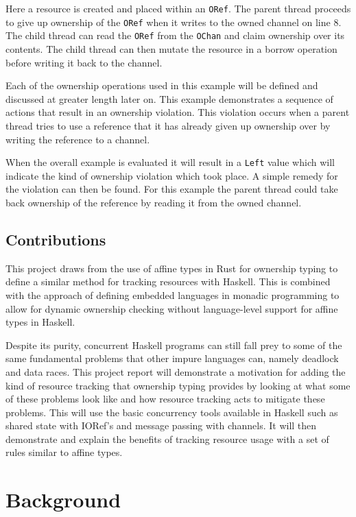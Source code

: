 \documentclass[onehalf,11pt]{beavtex}
\begin{document}
Here a resource is created and placed within an \texttt{ORef}.
The parent thread proceeds to give up ownership of the \texttt{ORef} when it
writes to the owned channel on line 8.
The child thread can read the \texttt{ORef} from the \texttt{OChan} and claim
ownership over its contents.
The child thread can then mutate the resource in a borrow operation before
writing it back to the channel. 

Each of the ownership operations used in this example will be defined
and discussed at greater length later on.
This example demonstrates a sequence of actions that result in an ownership
violation.
This violation occurs when a parent thread tries to use a reference that it
has already given up ownership over by writing the reference to a channel.

When the overall example is evaluated it will result in a \texttt{Left} value
which will indicate the kind of ownership violation which took place.
A simple remedy for the violation can then be found.
For this example the parent thread could take back ownership of the reference by
reading it from the owned channel.

\section{Contributions}

This project draws from the use of affine types in Rust for
ownership typing to define a similar method for tracking resources with Haskell.
This is combined with the approach of defining embedded languages in monadic
programming to allow for dynamic ownership checking without language-level
support for affine types in Haskell.

Despite its purity,
concurrent Haskell programs can still fall prey to some of the same fundamental
problems that other impure languages can, namely deadlock and data races.
This project report will demonstrate a motivation for adding the kind of
resource tracking that ownership typing provides by
looking at what some of these problems look like and how resource tracking acts
to mitigate these problems.
This will use the basic concurrency tools available in Haskell
such as shared state with IORef's and message passing with channels.
It will then demonstrate and explain the benefits of tracking resource usage
with a set of rules similar to affine types.

\chapter{Background}
\end{document}

